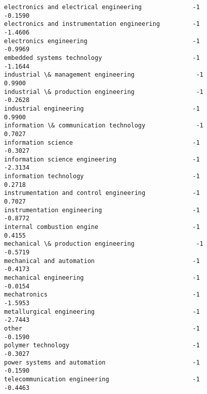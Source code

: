 \documentclass[11pt]{article}
\begin{document}
\begin{tcolorbox}[breakable, size=fbox, boxrule=.5pt, pad at break*=1mm, opacityfill=0]
\begin{Verbatim}[commandchars=\\\{\}]
electronics and electrical engineering              -1            -0.1590
electronics and instrumentation engineering         -1            -1.4606
electronics engineering                             -1            -0.9969
embedded systems technology                         -1            -1.1644
industrial \& management engineering                 -1             0.9900
industrial \& production engineering                 -1            -0.2628
industrial engineering                              -1             0.9900
information \& communication technology              -1             0.7027
information science                                 -1            -0.3027
information science engineering                     -1            -2.3134
information technology                              -1             0.2718
instrumentation and control engineering             -1             0.7027
instrumentation engineering                         -1            -0.8772
internal combustion engine                          -1             0.4155
mechanical \& production engineering                 -1            -0.5719
mechanical and automation                           -1            -0.4173
mechanical engineering                              -1            -0.0154
mechatronics                                        -1            -1.5953
metallurgical engineering                           -1            -2.7443
other                                               -1            -0.1590
polymer technology                                  -1            -0.3027
power systems and automation                        -1            -0.1590
telecommunication engineering                       -1            -0.4463


\end{Verbatim}
\end{tcolorbox}
\end{document}
